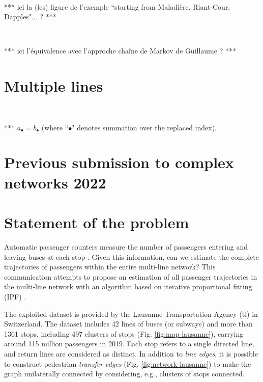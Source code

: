 \documentclass{llncs}
\begin{document}
\

*** ici la (les) figure de l'exemple  ``starting from Maladière, Riant-Cour, Dapples"... ? ***

\


*** ici l'équivalence avec l'approche chaîne de Markov de Guillaume ? ***
 


\section{Multiple lines} 

*** $a_{\bullet}=b_{\bullet}$ (where ``$\bullet$" denotes summation over the replaced index). 
 
\newpage

\section*{Previous submission to complex networks 2022}

%
\section*{Statement of the problem}
%

Automatic passenger counters measure the number of passengers entering and leaving buses at each stop \cite{boyle_passenger_1998}. Given this information, can we estimate the complete trajectories of passengers within the entire multi-line network? This communication attempts to propose an estimation of all passenger trajectories in the multi-line network with an algorithm based on iterative proportional fitting (IPF) \cite{bishop_discrete_2007}.

The exploited dataset is provided by the Lausanne Transportation Agency (tl) in Switzerland. The dataset includes 42 lines of buses (or subways) and more than 1361 stops, including 497 clusters of stops (Fig. \ref{fig:map-lausanne}),  carrying around 115 million passengers in 2019. Each stop refers to a single directed line, and return lines are considered as distinct.  In addition to  \emph{line edges},  it is possible to construct pedestrian \emph{transfer edges} (Fig. \ref{fig:network-lausanne}) to make the graph unilaterally connected by considering, e.g., clusters of stops connected.
\end{document}
